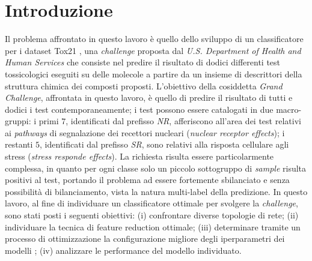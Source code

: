 \section{Introduzione}
Il problema affrontato in questo lavoro è quello dello sviluppo di un classificatore per i dataset Tox21 \cite{challenge_site}, una \textit{challenge} proposta dal \textit{U.S. Department of Health and Human Services} che consiste nel predire il risultato di dodici differenti test tossicologici eseguiti su delle molecole a partire da un insieme di descrittori della struttura chimica dei composti proposti.
L'obiettivo della cosiddetta \textit{Grand Challenge}, affrontata in questo lavoro, è quello di predire il risultato di tutti e dodici i test contemporaneamente; i test possono essere catalogati in due macro-gruppi: i primi $7$, identificati dal prefisso \textit{NR}, afferiscono all'area dei test relativi ai \textit{pathways} di segnalazione dei recettori nucleari (\textit{nuclear receptor effects}); i restanti $5$, identificati dal prefisso \textit{SR}, sono relativi alla risposta cellulare agli stress (\textit{stress responde effects}).
La richiesta risulta essere particolarmente complessa, in quanto per ogni classe solo un piccolo sottogruppo di \textit{sample} risulta positivi al test, portando il problema ad essere fortemente sbilanciato e senza possibilità di bilanciamento, vista la natura multi-label della predizione.
In questo lavoro, al fine di individuare un classificatore ottimale per svolgere la \textit{challenge}, sono stati posti i seguenti obiettivi: (i) confrontare diverse topologie di rete; (ii) individuare la tecnica di feature reduction ottimale; (iii) determinare tramite un processo di ottimizzazione la configurazione migliore degli iperparametri dei modelli ; (iv) analizzare le performance del modello individuato.